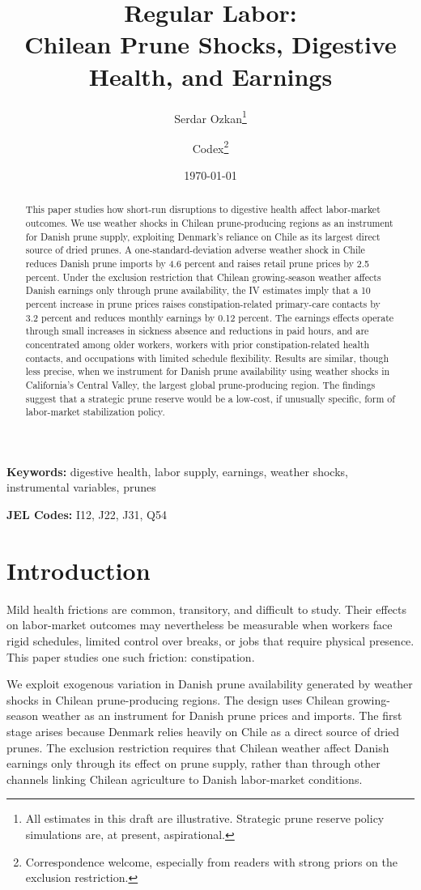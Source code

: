 \documentclass[12pt]{article}
\title{Regular Labor:\\
Chilean Prune Shocks, Digestive Health, and Earnings}
\author{
  Serdar Ozkan\thanks{All estimates in this draft are illustrative. Strategic prune reserve policy simulations are, at present, aspirational.}
  \and
  Codex\thanks{Correspondence welcome, especially from readers with strong priors on the exclusion restriction.}
}
\date{\today}
\begin{document}
\maketitle

\begin{abstract}
\noindent
This paper studies how short-run disruptions to digestive health affect labor-market outcomes. We use weather shocks in Chilean prune-producing regions as an instrument for Danish prune supply, exploiting Denmark's reliance on Chile as its largest direct source of dried prunes. A one-standard-deviation adverse weather shock in Chile reduces Danish prune imports by 4.6 percent and raises retail prune prices by 2.5 percent. Under the exclusion restriction that Chilean growing-season weather affects Danish earnings only through prune availability, the IV estimates imply that a 10 percent increase in prune prices raises constipation-related primary-care contacts by 3.2 percent and reduces monthly earnings by 0.12 percent. The earnings effects operate through small increases in sickness absence and reductions in paid hours, and are concentrated among older workers, workers with prior constipation-related health contacts, and occupations with limited schedule flexibility. Results are similar, though less precise, when we instrument for Danish prune availability using weather shocks in California's Central Valley, the largest global prune-producing region. The findings suggest that a strategic prune reserve would be a low-cost, if unusually specific, form of labor-market stabilization policy.
\end{abstract}

\noindent
\textbf{Keywords:} digestive health, labor supply, earnings, weather shocks, instrumental variables, prunes

\noindent
\textbf{JEL Codes:} I12, J22, J31, Q54

\onehalfspacing

\iffalse
\section{Introduction}

Mild health frictions are common, transitory, and difficult to study. Their effects on labor-market outcomes may nevertheless be measurable when workers face rigid schedules, limited control over breaks, or jobs that require physical presence. This paper studies one such friction: constipation.

We exploit exogenous variation in Danish prune availability generated by weather shocks in Chilean prune-producing regions. The design uses Chilean growing-season weather as an instrument for Danish prune prices and imports. The first stage arises because Denmark relies heavily on Chile as a direct source of dried prunes. The exclusion restriction requires that Chilean weather affect Danish earnings only through its effect on prune supply, rather than through other channels linking Chilean agriculture to Danish labor-market conditions.
\end{document}
